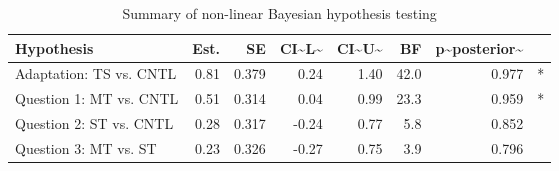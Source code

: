 \begin{table}

\caption{\label{tab:unnamed-chunk-28}Summary of non-linear Bayesian hypothesis testing}
\centering
\begin{tabular}[t]{l|r|r|r|r|r|r|l}
\hline
Hypothesis & Est. & SE & CI\textasciitilde{}L\textasciitilde{} & CI\textasciitilde{}U\textasciitilde{} & BF & p\textasciitilde{}posterior\textasciitilde{} & \\
\hline
Adaptation: TS vs. CNTL & 0.81 & 0.379 & 0.24 & 1.40 & 42.0 & 0.977 & *\\
\hline
Question 1: MT vs. CNTL & 0.51 & 0.314 & 0.04 & 0.99 & 23.3 & 0.959 & *\\
\hline
Question 2: ST vs. CNTL & 0.28 & 0.317 & -0.24 & 0.77 & 5.8 & 0.852 & \\
\hline
Question 3: MT vs. ST & 0.23 & 0.326 & -0.27 & 0.75 & 3.9 & 0.796 & \\
\hline
\end{tabular}
\end{table}
